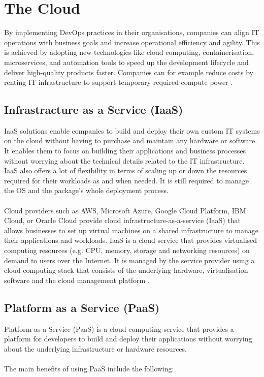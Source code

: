 \documentclass[BIF,Bachelor,nenglish]{twbook}%
\begin{document}
\section{The Cloud}
By implementing DevOps practices in their organisations, companies can align IT operations with business goals and increase operational efficiency and agility. This is achieved by adopting new technologies like cloud computing, containerisation, microservices, and automation tools to speed up the development lifecycle and deliver high-quality products faster. Companies can for example reduce costs by renting IT infrastructure to support temporary required compute power \cite{qia2009}.

\subsection{Infrastracture as a Service (IaaS)}
IaaS solutions enable companies to build and deploy their own custom IT systems on the cloud without having to purchase and maintain any hardware or software. It enables them to focus on building their applications and business processes without worrying about the technical details related to the IT infrastructure. IaaS also offers a lot of flexibility in terms of scaling up or down the resources required for their workloads as and when needed. It is still required to manage the OS and the package's whole deployment process.
\\
\\
Cloud providers such as AWS, Microsoft Azure, Google Cloud Platform, IBM Cloud, or Oracle Cloud provide cloud infrastructure-as-a-service (IaaS) that allows businesses to set up virtual machines on a shared infrastructure to manage their applications and workloads. IaaS is a cloud service that provides virtualised computing resources (e.g. CPU, memory, storage and networking resources) on demand to users over the Internet. It is managed by the service provider using a cloud computing stack that consists of the underlying hardware, virtualisation software and the cloud management platform \cite{buy2019} .


\subsection{Platform as a Service (PaaS)}
Platform as a Service (PaaS) is a cloud computing service that provides a platform for developers to build and deploy their applications without worrying about the underlying infrastructure or hardware resources.
\\
\\
The main benefits of using PaaS include the following:
\end{document}
